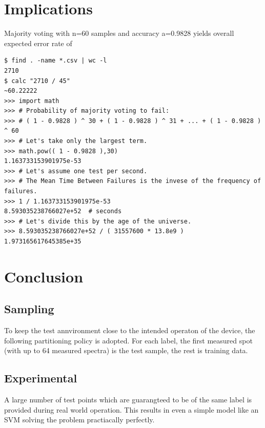 \documentclass{article}
\begin{document}
\section{Implications}
Majority voting with n=60 samples and accuracy a=0.9828 yields overall expected error rate of
\begin{verbatim}
$ find . -name *.csv | wc -l
2710
$ calc "2710 / 45"
~60.22222
>>> import math
>>> # Probability of majority voting to fail:
>>> # ( 1 - 0.9828 ) ^ 30 + ( 1 - 0.9828 ) ^ 31 + ... + ( 1 - 0.9828 ) ^ 60
>>> # Let's take only the largest term.
>>> math.pow(( 1 - 0.9828 ),30)
1.163733153901975e-53
>>> # Let's assume one test per second.
>>> # The Mean Time Between Failures is the invese of the frequency of failures.
>>> 1 / 1.163733153901975e-53
8.593035238766027e+52  # seconds
>>> # Let's divide this by the age of the universe.
>>> 8.593035238766027e+52 / ( 31557600 * 13.8e9 )
1.973165617645385e+35
\end{verbatim}


\section{Conclusion}
\subsection{Sampling}
To keep the test annvironment close to the intended operaton of the device, the following partitioning policy is adopted.
For each label, the first measured spot (with up to 64 measured spectra) is the test sample, the rest is training data.


\subsection{Experimental}
A large number of test points which are guarangteed to be of the same label is provided during real world operation.
This results in even a simple model like an SVM solving the problem practiacally perfectly.
\end{document}
